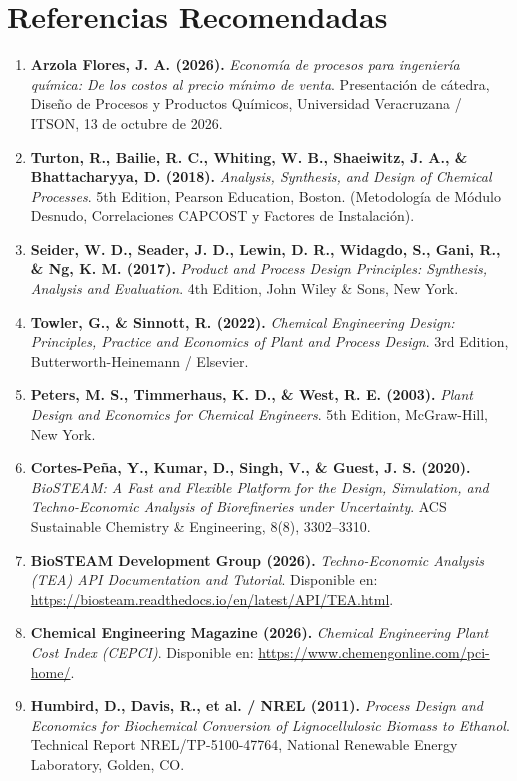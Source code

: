 \documentclass[11pt,letterpaper]{article}
\begin{document}
\section{Referencias Recomendadas}

\begin{enumerate}[leftmargin=*]
    \item \textbf{Arzola Flores, J. A. (2026).} \textit{Economía de procesos para ingeniería química: De los costos al precio mínimo de venta}. Presentación de cátedra, Diseño de Procesos y Productos Químicos, Universidad Veracruzana / ITSON, 13 de octubre de 2026.
    \item \textbf{Turton, R., Bailie, R. C., Whiting, W. B., Shaeiwitz, J. A., \& Bhattacharyya, D. (2018).} \textit{Analysis, Synthesis, and Design of Chemical Processes}. 5th Edition, Pearson Education, Boston. (Metodología de Módulo Desnudo, Correlaciones CAPCOST y Factores de Instalación).
    \item \textbf{Seider, W. D., Seader, J. D., Lewin, D. R., Widagdo, S., Gani, R., \& Ng, K. M. (2017).} \textit{Product and Process Design Principles: Synthesis, Analysis and Evaluation}. 4th Edition, John Wiley \& Sons, New York.
    \item \textbf{Towler, G., \& Sinnott, R. (2022).} \textit{Chemical Engineering Design: Principles, Practice and Economics of Plant and Process Design}. 3rd Edition, Butterworth-Heinemann / Elsevier.
    \item \textbf{Peters, M. S., Timmerhaus, K. D., \& West, R. E. (2003).} \textit{Plant Design and Economics for Chemical Engineers}. 5th Edition, McGraw-Hill, New York.
    \item \textbf{Cortes-Peña, Y., Kumar, D., Singh, V., \& Guest, J. S. (2020).} \textit{BioSTEAM: A Fast and Flexible Platform for the Design, Simulation, and Techno-Economic Analysis of Biorefineries under Uncertainty}. ACS Sustainable Chemistry \& Engineering, 8(8), 3302–3310.
    \item \textbf{BioSTEAM Development Group (2026).} \textit{Techno-Economic Analysis (TEA) API Documentation and Tutorial}. Disponible en: \url{https://biosteam.readthedocs.io/en/latest/API/TEA.html}.
    \item \textbf{Chemical Engineering Magazine (2026).} \textit{Chemical Engineering Plant Cost Index (CEPCI)}. Disponible en: \url{https://www.chemengonline.com/pci-home/}.
    \item \textbf{Humbird, D., Davis, R., et al. / NREL (2011).} \textit{Process Design and Economics for Biochemical Conversion of Lignocellulosic Biomass to Ethanol}. Technical Report NREL/TP-5100-47764, National Renewable Energy Laboratory, Golden, CO.
\end{enumerate}
\end{document}
